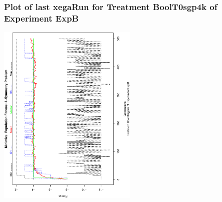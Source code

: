  \begin{frame}
 \frametitle{ Plot of last xegaRun for Treatment BoolT0sgp4k of Experiment ExpB }
 \begin{center}
\includegraphics[width=0.5\textwidth, angle=-90]
{ExpBPlotPopStatsFigure002.eps}
 \end{center}
 \label{report/ExpBPlotPopStatsFigure002.eps}  
 \end{frame}

